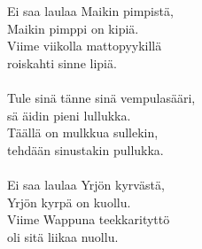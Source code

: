 
            Ei saa laulaa Maikin pimpistä, \\
            Maikin pimppi on kipiä. \\
            Viime viikolla mattopyykillä \\
            roiskahti sinne lipiä. \\
\hspace{10mm} \\
            Tule sinä tänne sinä vempulasääri, \\
            sä äidin pieni lullukka. \\
            Täällä on mulkkua sullekin, \\
            tehdään sinustakin pullukka. \\
\hspace{10mm} \\
            Ei saa laulaa Yrjön kyrvästä, \\
            Yrjön kyrpä on kuollu. \\
            Viime Wappuna teekkarityttö \\
            oli sitä liikaa nuollu. \\
